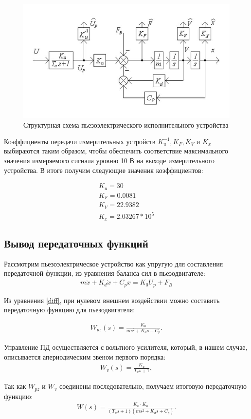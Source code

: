 \documentclass[a4paper, 12pt]{article}
\begin{document}
\begin{figure}[h!]
	\centering
	\includegraphics[width = 0.65\textheight]{first}
	\caption{Структурная схема пьезоэлектрического исполнительного устройства}
	\label{first}
\end{figure}

Коэффициенты передачи измерительных устройств $K_u^{-1}, K_F, K_V $ и $K_x$ выбираются таким образом, чтобы обеспечить соответствие максимального значения измеряемого сигнала уровню 10 В на выходе измерительного устройства. В итоге получим следующие значения коэффициентов:

\begin{gather}
	K_u = 30\\
	K_F = 0.0081\\
	K_V = 22.9382\\
	K_x = 2.03267*10^5	
\end{gather}

\newpage

\begin{center}
	\section{Вывод передаточных функций}
\end{center}

Рассмотрим пьезоэлектрическое устройство как упругую для составления передаточной функции, из уравнения баланса сил в пьезодвигателе:
\begin{align}
	m\ddot{x} + K_d\dot{x} + C_px = K_0U_p + F_B
	\label{diff}
\end{align}\par
Из уравнения \ref{diff}, при нулевом внешнем воздействии можно составить передаточную функцию для пьезодвигателя:

\begin{align} 
	W_{pz}(s) =\frac{K_0}{ms^2 + K_ds + C_p}.
	\label{Wpz}
\end{align}\par
Управление ПД осуществляется с вольтного усилителя, который, в нашем случае, описывается апериодическим звеном первого порядка:
\begin{align}
	W_{v}(s) = \frac{K_u}{T_us + 1},
\end{align}
\par
Так как $W_{pz}$ и $W_v$ соединены последовательно, получаем итоговую передаточную функцию:
\begin{align}
	W(s) = \frac{K_0\cdot K_u}{(T_us + 1)(ms^2 + K_ds + C_p)}.
\end{align}
\end{document}
